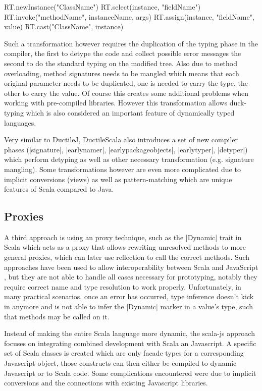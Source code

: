 \begin{lstlisting-nobreak}
RT.newInstance("ClassName")
RT.select(instance, "fieldName")
RT.invoke("methodName", instanceName, args)
RT.assign(instance, "fieldName", value)
RT.cast("ClassName", instance)
\end{lstlisting-nobreak}

Such a transformation however requires the duplication of the typing phase in the compiler, the first to detype the code and collect possible error messages the second to do the standard typing on the modified tree. Also due to method overloading, method signatures needs to be mangled which means that each original parameter needs to be duplicated, one is needed to carry the type, the other to carry the value. Of course this creates some additional problems when working with pre-compiled libraries. However this transformation allows duck-typing which is also considered an important feature of dynamically typed languages.

Very similar to DuctileJ, DuctileScala \cite{ductilescala} also introduces a set of new compiler phases (|signature|, |earlynamer|, |earlypackageobjects|, |earlytyper|, |detyper|) which perform detyping as well as other necessary transformation (e.g. signature mangling). Some transformations however are even more complicated due to implicit conversions (views) as well as pattern-matching which are unique features of Scala compared to Java.

\subsection{Proxies}

A third approach is using an proxy technique, such as the |Dynamic| trait in Scala \cite{dynamic} which acts as a proxy that allows rewriting unresolved methods to more general proxies, which can later use reflection to call the correct methods. Such approaches have been used to allow interoperability between Scala and JavaScript \cite{scala-js}, but they are not able to handle all cases necessary for prototyping, notably they require correct name and type resolution to work properly. Unfortunately, in many practical scenarios, once an error has occurred, type inference doesn't kick in anymore and is not able to infer the |Dynamic| marker in a value's type, such that methods may be called on it.

Instead of making the entire Scala language more dynamic, the scala-js approach \cite{scala-js} focuses on integrating combined development with Scala an Javascript. A specific set of Scala classes is created which are only facade types for a corresponding Javascript object, those constructs can then either be compiled to dynamic Javascript or to Scala code. Some complications encountered were due to implicit conversions and the connections with existing Javascript libraries.


